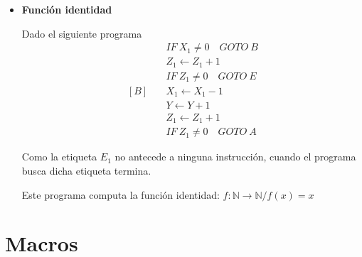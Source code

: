 \begin{itemize}
\begin{center}
\begin{tabular}{c c}
            &

            \begin{tabular}{c | c}
                $X_1$ & $Y$ \\
                \hline
                0 & 0 \\
            \end{tabular}
        \end{tabular}
        \end{center}

        Notemos que el programa nunca termina si entramos con una constante
        distinta de cero.

        Entonces este programa computa la función 
        $f: \mathbb{N} \to \mathbb{N} /
        f(x) = \begin{cases}
            \uparrow & x \neq 0 \\
            0 & x = 0
        \end{cases}$

        Donde $\uparrow$ significa que no está definida la función, es decir,
        el programa nunca termina.

    \item \textbf{Función identidad}

        Dado el siguiente programa
        \begin{align*}
            [A] \quad &IF ~ X_1 \neq 0 \quad GOTO ~ B \\
                        &Z_1 \gets Z_1 + 1 \\
                        &IF ~ Z_1 \neq 0 \quad GOTO ~ E \\
            [B] \quad &X_1 \gets X_1 - 1 \\
                        &Y \gets Y + 1 \\
                        &Z_1 \gets Z_1 + 1 \\
                        &IF ~ Z_1 \neq 0 \quad GOTO ~ A
        \end{align*}

        Como la etiqueta $E_1$ no antecede a ninguna instrucción, cuando el
        programa busca dicha etiqueta termina.

        Este programa computa la función identidad:
        $f: \mathbb{N} \to \mathbb{N} / f(x) = x$
\end{itemize}


\section{Macros}

